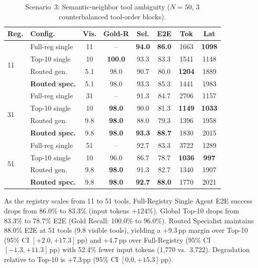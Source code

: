 \begin{table}[!htb]
\centering
\caption{Scenario~3: Semantic-neighbor tool ambiguity ($N=50$, 3 counterbalanced tool-order blocks).}
\label{tab:tool_ambiguity}
{\small\setlength{\tabcolsep}{2.5pt}
\begin{tabular}{llcccccc}
\toprule
\textbf{Reg.} & \textbf{Config.} & \textbf{Vis.} & \textbf{Gold-R} & \textbf{Sel.} & \textbf{E2E} & \textbf{Tok} & \textbf{Lat} \\
\midrule
\multirow{4}{*}{11} & Full-reg single & 11 & -- & \textbf{94.0} & \textbf{86.0} & 1663 & \textbf{1098} \\
 & Top-10 single   & 10 & \textbf{100.0} & 93.3 & 83.3 & 1541 & 1148 \\
 & Routed gen.     & 5.1 & 98.0 & 90.7 & 80.0 & \textbf{1204} & 1889 \\
 & \textbf{Routed spec.} & 5.1 & 98.0 & 93.3 & 85.3 & 1441 & 1983 \\
\midrule
\multirow{4}{*}{31} & Full-reg single & 31 & -- & 91.3 & 84.7 & 2706 & 1157 \\
 & Top-10 single   & 10 & \textbf{98.0} & 90.0 & 81.3 & \textbf{1149} & \textbf{1033} \\
 & Routed gen.     & 9.8 & \textbf{98.0} & 88.0 & 79.3 & 1396 & 1958 \\
 & \textbf{Routed spec.} & 9.8 & \textbf{98.0} & \textbf{93.3} & \textbf{88.7} & 1830 & 2015 \\
\midrule
\multirow{4}{*}{51} & Full-reg single & 51 & -- & 92.7 & 83.3 & 3722 & 1289 \\
 & Top-10 single   & 10 & 96.0 & 86.7 & 78.7 & \textbf{1036} & \textbf{997} \\
 & Routed gen.     & 9.8 & \textbf{98.0} & 91.3 & 82.7 & 1340 & 1907 \\
 & \textbf{Routed spec.} & 9.8 & \textbf{98.0} & \textbf{92.7} & \textbf{88.0} & 1770 & 2021 \\
\bottomrule
\end{tabular}}
\end{table}

As the registry scales from 11 to 51 tools, Full-Registry Single Agent E2E success drops from 86.0\% to 83.3\% (input tokens $+124\%$). Global Top-10 drops from 83.3\% to 78.7\% E2E (Gold Recall: 100.0\% to 96.0\%). Routed Specialist maintains 88.0\% E2E at 51 tools (9.8 visible tools), yielding a +9.3\,pp margin over Top-10 (95\% CI $[+2.0, +17.3]$\,pp) and +4.7\,pp over Full-Registry (95\% CI $[-1.3, +11.3]$\,pp) with 52.4\% fewer input tokens (1{,}770 vs.\ 3{,}722). Degradation relative to Top-10 is $+7.3$\,pp (95\% CI $[0.0, +15.3]$\,pp).

